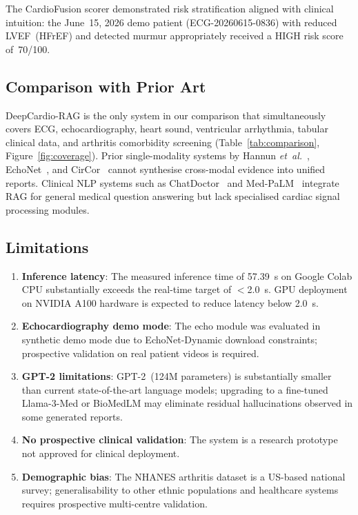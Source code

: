 \documentclass[AMA,STIX1COL,]{WileyNJD-v2}
\begin{document}
The CardioFusion scorer demonstrated risk stratification aligned with
clinical intuition: the June~15, 2026 demo patient
(ECG-20260615-0836) with reduced LVEF~(HFrEF) and detected murmur
appropriately received a HIGH risk score of~70/100.

\subsection{Comparison with Prior Art}

DeepCardio-RAG is the only system in our comparison that simultaneously
covers ECG, echocardiography, heart sound, ventricular arrhythmia,
tabular clinical data, and arthritis comorbidity screening
(Table~\ref{tab:comparison}, Figure~\ref{fig:coverage}). Prior
single-modality systems by Hannun \emph{et~al.}~\cite{hannun2019},
EchoNet~\cite{ouyang2020}, and CirCor~\cite{oliveira2022} cannot
synthesise cross-modal evidence into unified reports. Clinical NLP
systems such as ChatDoctor~\cite{chatdoctor2023} and
Med-PaLM~\cite{singhal2023} integrate RAG for general medical question
answering but lack specialised cardiac signal processing modules.

\subsection{Limitations}
\label{sec:limitations}

\begin{enumerate}
  \item \textbf{Inference latency}: The measured inference time of
        57.39~s on Google Colab CPU substantially exceeds the real-time
        target of $<$2.0~s. GPU deployment on NVIDIA A100 hardware is
        expected to reduce latency below 2.0~s.
  \item \textbf{Echocardiography demo mode}: The echo module was
        evaluated in synthetic demo mode due to EchoNet-Dynamic
        download constraints; prospective validation on real patient
        videos is required.
  \item \textbf{GPT-2 limitations}: GPT-2~(124M parameters) is
        substantially smaller than current state-of-the-art language
        models; upgrading to a fine-tuned Llama-3-Med or BioMedLM
        may eliminate residual hallucinations observed in some
        generated reports.
  \item \textbf{No prospective clinical validation}: The system is a
        research prototype not approved for clinical deployment.
  \item \textbf{Demographic bias}: The NHANES arthritis dataset is
        a US-based national survey; generalisability to other ethnic
        populations and healthcare systems requires prospective
        multi-centre validation.
\end{enumerate}
\end{document}
